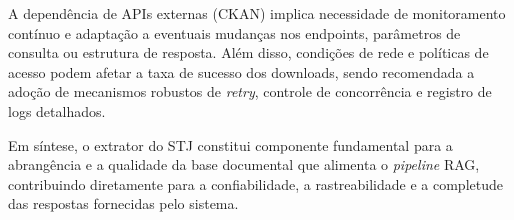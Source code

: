 A dependência de APIs externas (CKAN) implica necessidade de monitoramento contínuo e adaptação a eventuais mudanças nos endpoints, parâmetros de consulta ou estrutura de resposta. Além disso, condições de rede e políticas de acesso podem afetar a taxa de sucesso dos downloads, sendo recomendada a adoção de mecanismos robustos de \textit{retry}, controle de concorrência e registro de logs detalhados.

Em síntese, o extrator do STJ constitui componente fundamental para a abrangência e a qualidade da base documental que alimenta o \textit{pipeline} RAG, contribuindo diretamente para a confiabilidade, a rastreabilidade e a completude das respostas fornecidas pelo sistema.

